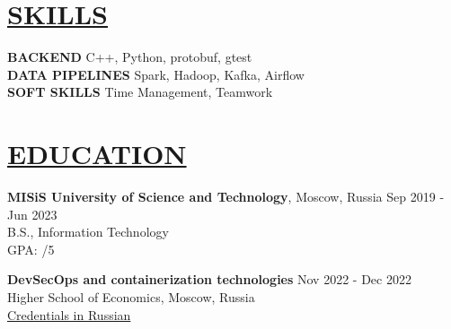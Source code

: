 \documentclass{resume} %
\begin{document}
\begin{multicols}{2}
    \begin{minipage}{\linewidth}
        \section*{\uline{SKILLS \hfill}}
        {\bf BACKEND} \hfill C++, Python, protobuf, gtest \\
        {\bf DATA PIPELINES} \hfill Spark, Hadoop, Kafka, Airflow \\
        {\bf SOFT SKILLS} \hfill Time Management, Teamwork \\
    \end{minipage}

    \begin{minipage}{\linewidth}
        \section*{\uline{EDUCATION \hfill}}
        {\bf MISiS University of Science and Technology}, Moscow, Russia \hfill {Sep 2019 - Jun 2023}\\
        B.S., Information Technology\\
        GPA: /5\\
    \end{minipage}
\end{multicols}

{\bf DevSecOps and containerization technologies} \hfill {Nov 2022 - Dec 2022} \\
Higher School of Economics, Moscow, Russia \\
\href{https://drive.google.com/file/d/11NyGWnh3GeXqrwNIw-2x_bBE39JUaymN}{Credentials in Russian}

\end{document}
